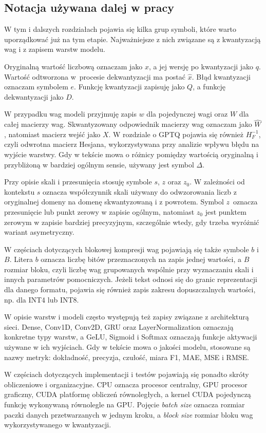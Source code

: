 \subsection{Notacja używana dalej w pracy}

W tym i dalszych rozdziałach pojawia się kilka grup symboli, które warto uporządkować już na tym etapie. Najważniejsze z nich związane są z kwantyzacją wag i z zapisem warstw modelu.

Oryginalną wartość liczbową oznaczam jako $x$, a jej wersję po kwantyzacji jako $q$. Wartość odtworzona w~procesie dekwantyzacji ma postać $\hat{x}$. Błąd kwantyzacji oznaczam symbolem $e$. Funkcję kwantyzacji zapisuję jako $Q$, a funkcję dekwantyzacji jako $D$.

W przypadku wag modeli przyjmuję zapis $w$ dla pojedynczej wagi oraz $W$ dla całej macierzy wag. Skwantyzowany odpowiednik macierzy wag oznaczam jako $\hat{W}$, natomiast macierz wejść jako $X$. W rozdziale o GPTQ pojawia się również $H_F^{-1}$, czyli odwrotna macierz Hesjana, wykorzystywana przy analizie wpływu błędu na wyjście warstwy. Gdy w tekście mowa o różnicy pomiędzy wartością oryginalną i przybliżoną w bardziej ogólnym sensie, używany jest symbol $\Delta$.

Przy opisie skali i przesunięcia stosuję symbole $s$, $z$ oraz $z_0$. W zależności od kontekstu $s$ oznacza współczynnik skali używany do odwzorowania liczb z oryginalnej domeny na domenę skwantyzowaną i z powrotem. Symbol $z$~oznacza przesunięcie lub punkt zerowy w zapisie ogólnym, natomiast $z_0$ jest punktem zerowym w zapisie bardziej precyzyjnym, szczególnie wtedy, gdy trzeba wyróżnić wariant asymetryczny.

W częściach dotyczących blokowej kompresji wag pojawiają się także symbole $b$ i $B$. Litera $b$ oznacza liczbę bitów przeznaczonych na zapis jednej wartości, a $B$ rozmiar bloku, czyli liczbę wag grupowanych wspólnie przy wyznaczaniu skali i innych parametrów pomocniczych. Jeżeli tekst odnosi się do granic reprezentacji dla danego formatu, pojawia się również zapis zakresu dopuszczalnych wartości, np. dla INT4 lub INT8.

W opisie warstw i modeli często występują też zapisy związane z architekturą sieci. Dense, Conv1D, Conv2D, GRU oraz LayerNormalization oznaczają konkretne typy warstw, a GeLU, Sigmoid i Softmax oznaczają funkcje aktywacji używane w ich wyjściach. Gdy w tekście mowa o jakości modelu, stosowane są nazwy metryk: dokładność, precyzja, czułość, miara F1, MAE, MSE i RMSE.

W częściach dotyczących implementacji i testów pojawiają się ponadto skróty obliczeniowe i organizacyjne. CPU oznacza procesor centralny, GPU procesor graficzny, CUDA platformę obliczeń równoległych, a kernel CUDA pojedynczą funkcję wykonywaną równolegle na GPU. Pojęcie \textit{batch size} oznacza rozmiar paczki danych przetwarzanych w jednym kroku, a \textit{block size} rozmiar bloku wag wykorzystywanego w kwantyzacji.
